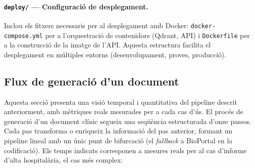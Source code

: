 \documentclass[CAT]{TFUOC}%
\begin{document}
\paragraph{\texttt{deploy/} --- Configuració de desplegament.}
Inclou els fitxers necessaris per al desplegament amb Docker: \texttt{docker-compose.yml} per a l'orquestració de contenidors (Qdrant, API) i \texttt{Dockerfile} per a la construcció de la imatge de l'API. Aquesta estructura facilita el desplegament en múltiples entorns (desenvolupament, proves, producció).

\subsection{Flux de generació d'un document}
\label{sec:flux-generacio}

Aquesta secció presenta una visió temporal i quantitativa del pipeline descrit anteriorment, amb mètriques reals mesurades per a cada cas d'ús. El procés de generació d'un document clínic segueix una seqüència estructurada d'onze passos. Cada pas transforma o enriqueix la informació del pas anterior, formant un pipeline lineal amb un únic punt de bifurcació (el \textit{fallback} a BioPortal en la codificació). Els temps indicats corresponen a mesures reals per al cas d'informe d'alta hospitalària, el cas més complex:
\end{document}
